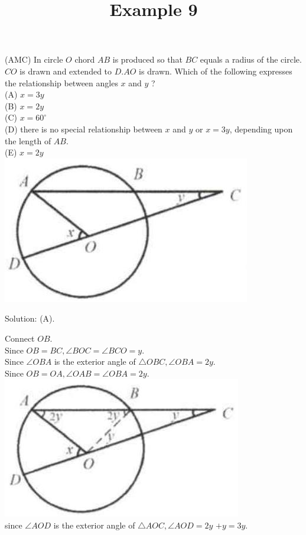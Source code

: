 \documentclass{article}
\title{Example 9}
\date{}
\begin{document}
\maketitle

(AMC) In circle \(O\) chord \(A B\) is produced so that \(B C\) equals a radius of the circle. \(C O\) is drawn and extended to \(D . A O\) is drawn. Which of the following expresses the relationship between angles \(x\) and \(y\) ?\\
(A) \(x=3 y\)\\
(B) \(x=2 y\)\\
(C) \(x=60^{\circ}\)\\
(D) there is no special relationship between \(x\) and \(y\) or \(x=3 y\), depending upon the length of \(A B\).\\
(E) \(x=2 y\)\\
\centering
\includegraphics[width=\textwidth]{images/problem_image_1.jpg}

Solution: (A).


Connect \(O B\).\\
Since \(O B=B C, \angle B O C=\angle B C O=y\).\\
Since \(\angle O B A\) is the exterior angle of \(\triangle O B C, \angle O B A=2 y\).\\
Since \(O B=O A, \angle O A B=\angle O B A=2 y\).\\
\centering
\includegraphics[width=\textwidth]{images/reasoning_image_1.jpg}\\
since \(\angle A O D\) is the exterior angle of \(\triangle A O C, \angle A O D=2 y\) \(+y=3 y\).
\end{document}
